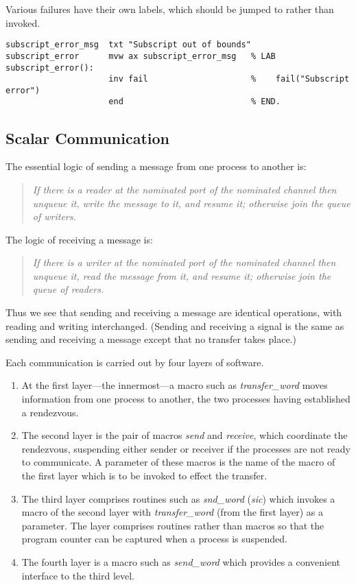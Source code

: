 Various failures have their own labels, which should be jumped to rather than invoked.

{\small
\begin{verbatim}
subscript_error_msg  txt "Subscript out of bounds"
subscript_error      mvw ax subscript_error_msg   % LAB subscript_error():
                     inv fail                     %    fail("Subscript error")
                     end                          % END.
\end{verbatim}}



\subsection{Scalar Communication}
The essential logic of sending a message from one process to another is:
\begin{quote}
   \emph{If there is a reader at the nominated port of the nominated channel then unqueue it, write the message to it, and resume it; otherwise join the queue of writers.}
\end{quote}
The logic of receiving a message is:
\begin{quote}
   \emph{If there is a writer at the nominated port of the nominated channel then unqueue it, read the message from it, and resume it; otherwise join the queue of readers.}
\end{quote}
Thus we see that sending and receiving a message are identical operations, with reading and writing interchanged. (Sending and receiving a signal is the same as sending and receiving a message except that no transfer takes place.)

Each communication is carried out by four layers of software.

\begin{enumerate}
	\item
   At the first layer---the innermost---a macro such as \emph{transfer\_word} moves information from one process to another, the two processes having established a rendezvous.
   \item
   The second layer is the pair of macros \emph{send} and \emph{receive}, which coordinate the rendezvous, suspending either sender or receiver if the processes are not ready to communicate. A parameter of these macros is the name of the macro of the first layer which is to be invoked to effect the transfer.
   \item
   The third layer comprises routines such as \emph{snd\_word} (\emph{sic}) which invokes a macro of the second layer with \emph{transfer\_word} (from the first layer) as a parameter. The layer comprises routines rather than macros so that the program counter can be captured when a process is suspended.
   \item
   The fourth layer is a macro such as \emph{send\_word} which provides a convenient interface to the third level.
\end{enumerate}

